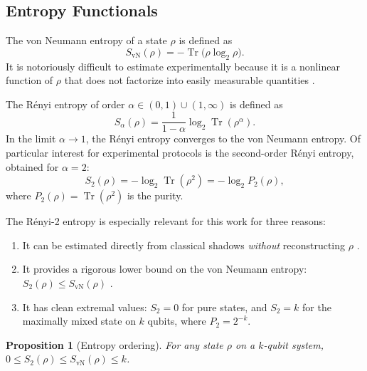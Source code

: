 \documentclass[12pt,a4paper,oneside]{book}
\theoremstyle{plain}
\newtheorem{proposition}[theorem]{Proposition}
\theoremstyle{definition}
\theoremstyle{remark}
\begin{document}
\subsection{Entropy Functionals}

The von Neumann entropy of a state $\rho$ is defined as
\begin{equation}
    S_{\text{vN}}(\rho) = -\operatorname{Tr}\bigl(\rho \log_2 \rho\bigr).
\end{equation}
It is notoriously difficult to estimate experimentally because it is a nonlinear function of $\rho$ that does not factorize into easily measurable quantities \cite{horodecki2009quantum}.

The R\'enyi entropy of order $\alpha \in (0,1) \cup (1,\infty)$ is defined as \cite{renyi1961entropy}
\begin{equation}
    S_\alpha(\rho) = \frac{1}{1 - \alpha} \log_2 \operatorname{Tr}(\rho^\alpha).
\end{equation}
In the limit $\alpha \to 1$, the R\'enyi entropy converges to the von Neumann entropy. Of particular interest for experimental protocols is the second-order R\'enyi entropy, obtained for $\alpha = 2$:
\begin{equation}
    \label{eq:renyi2}
    S_2(\rho) = -\log_2 \operatorname{Tr}(\rho^2) = -\log_2 P_2(\rho),
\end{equation}
where $P_2(\rho) = \operatorname{Tr}(\rho^2)$ is the purity.

The R\'enyi-2 entropy is especially relevant for this work for three reasons:
\begin{enumerate}
    \item It can be estimated directly from classical shadows \emph{without} reconstructing $\rho$ \cite{huang2020predicting, elben2020cross, brydges2019probing}.
    \item It provides a rigorous lower bound on the von Neumann entropy: $S_2(\rho) \leq S_{\text{vN}}(\rho)$ \cite{renyi1961entropy}.
    \item It has clean extremal values: $S_2 = 0$ for pure states, and $S_2 = k$ for the maximally mixed state on $k$ qubits, where $P_2 = 2^{-k}$.
\end{enumerate}

\begin{proposition}[Entropy ordering]\label{prop:entropy_ordering}
For any state $\rho$ on a $k$-qubit system, $0 \leq S_2(\rho) \leq S_{\text{vN}}(\rho) \leq k$.
\end{proposition}
\end{document}
